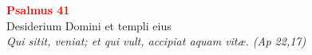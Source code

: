 


\def\greinitialformat#1{%
{\fontsize{39}{39}\selectfont #1}%
}




\vspace{0.3cm}
\begin{center}
 \textcolor{red}{\large \bf Psalmus 41}\\
Desiderium Domini et templi eius\\
\textit{\small Qui sitit, veniat; et qui vult, accipiat aquam vitæ. (Ap 22,17)}
\end{center}
